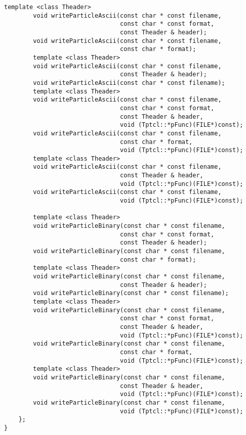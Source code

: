 \begin{lstlisting}[caption=ParticleSystem3]
        template <class Theader>
        void writeParticleAscii(const char * const filename,
                                const char * const format,
                                const Theader & header);        
        void writeParticleAscii(const char * const filename,
                                const char * format);                                       
        template <class Theader>
        void writeParticleAscii(const char * const filename,
                                const Theader & header);
        void writeParticleAscii(const char * const filename);
        template <class Theader>
        void writeParticleAscii(const char * const filename,
                                const char * const format,
                                const Theader & header,
                                void (Tptcl::*pFunc)(FILE*)const);   
        void writeParticleAscii(const char * const filename,
                                const char * format,
                                void (Tptcl::*pFunc)(FILE*)const);
        template <class Theader>
        void writeParticleAscii(const char * const filename,
                                const Theader & header,
                                void (Tptcl::*pFunc)(FILE*)const);
        void writeParticleAscii(const char * const filename,
                                void (Tptcl::*pFunc)(FILE*)const);

        template <class Theader>
        void writeParticleBinary(const char * const filename,
                                const char * const format,
                                const Theader & header);        
        void writeParticleBinary(const char * const filename,
                                const char * format);                                       
        template <class Theader>
        void writeParticleBinary(const char * const filename,
                                const Theader & header);
        void writeParticleBinary(const char * const filename);
        template <class Theader>
        void writeParticleBinary(const char * const filename,
                                const char * const format,
                                const Theader & header,
                                void (Tptcl::*pFunc)(FILE*)const);   
        void writeParticleBinary(const char * const filename,
                                const char * format,
                                void (Tptcl::*pFunc)(FILE*)const);
        template <class Theader>
        void writeParticleBinary(const char * const filename,
                                const Theader & header,
                                void (Tptcl::*pFunc)(FILE*)const);
        void writeParticleBinary(const char * const filename,
                                void (Tptcl::*pFunc)(FILE*)const);
    };
}
\end{lstlisting}


